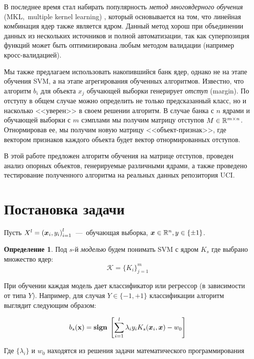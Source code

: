 \documentclass[12pt,twoside]{article}
\theoremstyle{plain}
\theoremstyle{remark}
\theoremstyle{definition}
\newtheorem{df}{Определение}[section]
\begin{document}
    В последнее время стал набирать популярность \emph{метод многоядерного обучения} (MKL,~multiple kernel learning) \cite{Dyrba2015, Bucak2014,Althloothi2014}, который основывается на том, что линейная комбинация ядер также является ядром. Данный метод хорош при объединении данных из нескольких источников и полной автоматизации, так как суперпозиция функций может быть оптимизирована любым методом валидации (например кросс-валидацией).

    Мы также предлагаем использовать накопившийся банк ядер, однако не на этапе обучения SVM, а на этапе агрегирования обученных алгоритмов. Известно, что алгоритм $b_i$ для объекта $x_j$ обучающей выборки генерирует \emph{отступ} (margin). По отступу в общем случае можно определить не только предсказанный класс, но и насколько <<уверен>> в своем решении алгоритм. В случае банка с $n$ ядрами и обучающей выборки с $m$ сэмплами
    мы получим матрицу отступов $M \in \R^{m\times n}$. Отнормировав ее, мы получим новую матрицу <<объект-признак>>, где вектором признаков каждого объекта будет вектор отнормированных отступов.

    В этой работе предложен алгоритм обучения на матрице отступов, проведен анализ опорных объектов, генерируемые различными ядрами, а также проведено тестирование полученного алгоритма на реальных данных репозитория UCI.


\section{Постановка задачи}

Пусть $X^l = \left(\boldsymbol{x}_i, y_i\right)_{i=1}^l$~---~обучающая выборка, $\boldsymbol{x}\in \mathbb{R}^n, y \in \{\pm 1\}$.

\begin{df}
	Под $s$-й \emph{моделью} будем понимать SVM с
ядром $K_s$ где выбрано множество ядер:
$$
\mathcal{K} = \{K_i\}_{j=1}^m
$$
\end{df}
	
При обучении каждая модель дает классификатор или регрессор (в зависимости от типа $Y$). Например, для случая $Y \in \{-1, +1\}$ классификации алгоритм выглядит следующим образом:

\begin{equation} \label{decision}
	b_s(\v{x}) = \sign\sbrs{\sum_{i=1}^l\lambda_i y_i K_s(\vec{x}_i, \vec{x}) - w_0}
\end{equation}

Где $\{\lambda_i\}$ и $w_0$ находятся из решения задачи математического программирования\cite{Smola2004}
\end{document}
